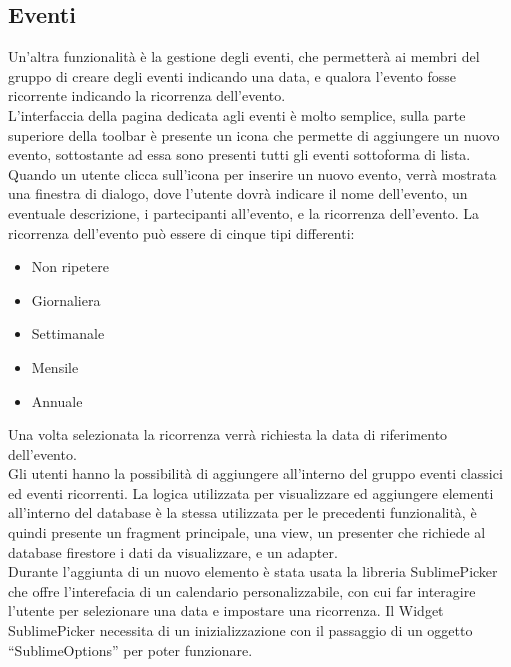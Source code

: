 \subsection{Eventi}
Un'altra funzionalità è la gestione degli eventi, che permetterà ai membri del gruppo di creare degli eventi indicando una data, e qualora l'evento fosse ricorrente indicando la ricorrenza dell'evento.\\
L'interfaccia della pagina dedicata agli eventi è molto semplice, sulla parte superiore della toolbar è presente un icona che permette di aggiungere un nuovo evento, sottostante ad essa sono presenti tutti gli eventi sottoforma di lista.\\
Quando un utente clicca sull'icona per inserire un nuovo evento, verrà mostrata una finestra di dialogo, dove l'utente dovrà indicare il nome dell'evento, un eventuale descrizione, i partecipanti all'evento, e la ricorrenza dell'evento. La ricorrenza dell'evento può essere di cinque tipi differenti:
\begin{itemize}
  \item Non ripetere
  \item Giornaliera
  \item Settimanale
  \item Mensile
  \item Annuale
\end{itemize}



Una volta selezionata la ricorrenza verrà richiesta la data di riferimento dell'evento.\\
Gli utenti hanno la possibilità di aggiungere all'interno del gruppo eventi classici ed eventi ricorrenti. La logica utilizzata per visualizzare ed aggiungere elementi all'interno del database è la stessa utilizzata per le precedenti funzionalità, è quindi presente un fragment principale, una view, un presenter che richiede al database firestore i dati da visualizzare, e un adapter.\\
Durante l'aggiunta di un nuovo elemento è stata usata la libreria SublimePicker che offre l'interefacia di un calendario personalizzabile, con cui far interagire l'utente per selezionare una data e impostare una ricorrenza. Il Widget SublimePicker necessita di un inizializzazione con il passaggio di un oggetto ``SublimeOptions'' per poter funzionare.\\


